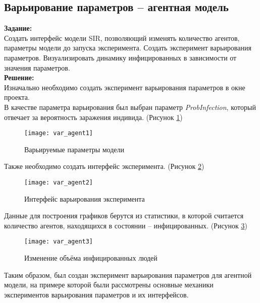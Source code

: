 \subsection*{Варьирование параметров -- агентная модель}

\textbf{Задание:}\\
Создать интерфейс модели SIR, позволяющий изменять количество агентов, параметры модели до запуска эксперимента. Создать эксперимент варьирования параметров. Визуализировать динамику инфицированных в зависимости от значения параметров.\\

\textbf{Решение:}\\
Изначально необходимо создать эксперимент варьирования параметров в окне проекта.\\

В качестве параметра варьирования был выбран параметр \textit{ProbInfection}, который отвечает за вероятность заражения индивида. (Рисунок \ref{fig:var_agent1})
\begin{figure}[h]
	\centering \texttt{[image: var\_agent1]}
	\caption{Варьируемые параметры модели}
	\label{fig:var_agent1}
\end{figure}

Также необходимо создать интерфейс эксперимента. (Рисунок \ref{fig:var_agent2})
\begin{figure}[h]
	\centering \texttt{[image: var\_agent2]}
	\caption{Интерфейс варьирования эксперимента}
	\label{fig:var_agent2}
\end{figure}

\newpage

Данные для построения графиков берутся из статистики, в которой считается количество агентов, находящихся в состоянии -- инфицированных. (Рисунок \ref{fig:var_agent3})
\begin{figure}[h]
	\centering \texttt{[image: var\_agent3]}
	\caption{Изменение объёма инфицированных людей}
	\label{fig:var_agent3}
\end{figure}

Таким образом, был создан эксперимент варьирования параметров для агентной модели, на примере которой были рассмотрены основные механики экспериментов варьирования параметров и их интерфейсов. 